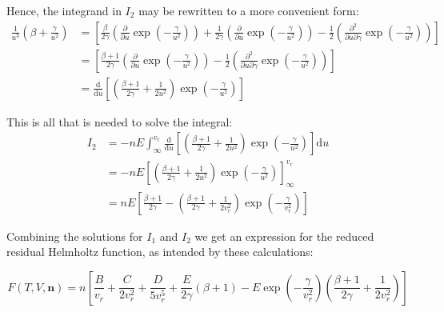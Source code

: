\documentclass[internal,english]{sintefmemo2012}
\numberwithin{equation}{section}
\newcommand*{\pd}[2]{\frac{\partial #1}{\partial #2}}
\begin{document}
Hence, the integrand in $I_2$ may be rewritten to a more convenient form:
\begin{equation}
\begin{split}
\frac{1}{u^3} \left(\beta + \frac{\gamma}{u^2}\right) 
& = \left[ \frac{\beta}{2 \gamma} \left( \pd{}{u} \exp{\left(-\frac{\gamma}{u^2} \right) } \right) + \frac{1}{2 \gamma} \left( \pd{}{u} \exp{\left(-\frac{\gamma}{u^2} \right) } \right) - \frac{1}{2} \left(\frac{\partial^2}{\partial u \partial \gamma} \exp{\left(-\frac{\gamma}{u^2}\right)} \right) \right] \\
& = \left[\frac{\beta + 1}{2 \gamma} \left( \pd{}{u} \exp{\left(-\frac{\gamma}{u^2} \right)} \right) - \frac{1}{2} \left(\frac{\partial^2}{\partial u \partial \gamma} \exp{\left(-\frac{\gamma}{u^2}\right)} \right) \right] \\
& = \frac{\mathrm{d}}{\mathrm{d}u} \left[\left( \frac{\beta + 1}{2 \gamma} + \frac{1}{2u^2} \right)\exp{\left(-\frac{\gamma}{u^2}\right)} \right] 
\end{split}
\end{equation}

This is all that is needed to solve the integral:
\begin{equation}
\begin{split}
I_2 
& = - n E\int_\infty ^{v_r} \frac{\mathrm{d}}{\mathrm{d}u} \left[\left( \frac{\beta + 1}{2 \gamma} + \frac{1}{2u^2} \right)\exp{\left(-\frac{\gamma}{u^2}\right)} \right]  \mathrm{d}u \\
& =  - n E{ \left[\left( \frac{\beta + 1}{2 \gamma} + \frac{1}{2u^2} \right)\exp{\left(-\frac{\gamma}{u^2}\right)} \right] }_ \infty ^{v_r} \\
& = n E\left[\frac{\beta + 1}{2 \gamma} - \left( \frac{\beta + 1}{2 \gamma} + \frac{1}{2v_r^2} \right)\exp{\left(-\frac{\gamma}{v_r^2}\right)} \right]
\end{split}
\end{equation}

Combining the solutions for $I_1$ and $I_2$ we get an expression for the reduced residual Helmholtz function, as intended by these calculations:

\begin{equation}
F(T,V,\textbf{n}) = n \left[\frac{B}{v_r} + \frac{C}{2 v_r^2} + \frac{D}{5 v_r^5} + \frac{E}{2 \gamma}(\beta + 1) - E\exp{\left(-\frac{\gamma}{v_r^2}\right)} \left( \frac{\beta + 1}{2 \gamma} + \frac{1}{2v_r^2} \right) \right]
\end{equation}

\clearpage
\end{document}
